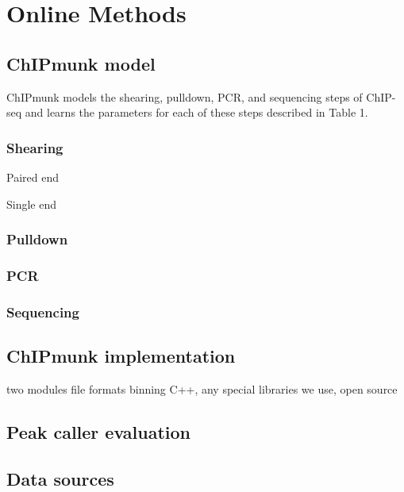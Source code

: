 \documentclass[12pt]{article}
\begin{document}
\section*{Online Methods}

\subsection*{ChIPmunk model}

ChIPmunk models the shearing, pulldown, PCR, and sequencing steps of ChIP-seq and learns the parameters for each of these steps described in Table 1. 

\subsubsection*{Shearing}

Paired end

Single end


\subsubsection*{Pulldown}

\subsubsection*{PCR}

\subsubsection*{Sequencing}

\subsection*{ChIPmunk implementation}

two modules
file formats
binning
C++, any special libraries we use, open source

\subsection*{Peak caller evaluation}

\subsection*{Data sources}
\end{document}
